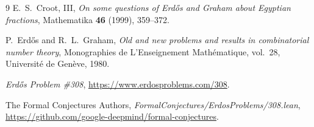 \documentclass[11pt,a4paper]{amsart}
\theoremstyle{remark}
\begin{document}
\begin{thebibliography}{9}
E.~S.~Croot, III, \emph{On some questions of Erd\H{o}s and Graham about Egyptian fractions}, Mathematika \textbf{46} (1999), 359--372.

P.~Erd\H{o}s and R.~L.~Graham, \emph{Old and new problems and results in combinatorial number theory}, Monographies de L'Enseignement Math\'ematique, vol.~28, Universit\'e de Gen\`eve, 1980.

\emph{Erd\H{o}s Problem \#308}, \url{https://www.erdosproblems.com/308}.

The Formal Conjectures Authors, \emph{FormalConjectures/ErdosProblems/308.lean},\\ \url{https://github.com/google-deepmind/formal-conjectures}.
\end{thebibliography}
\end{document}
